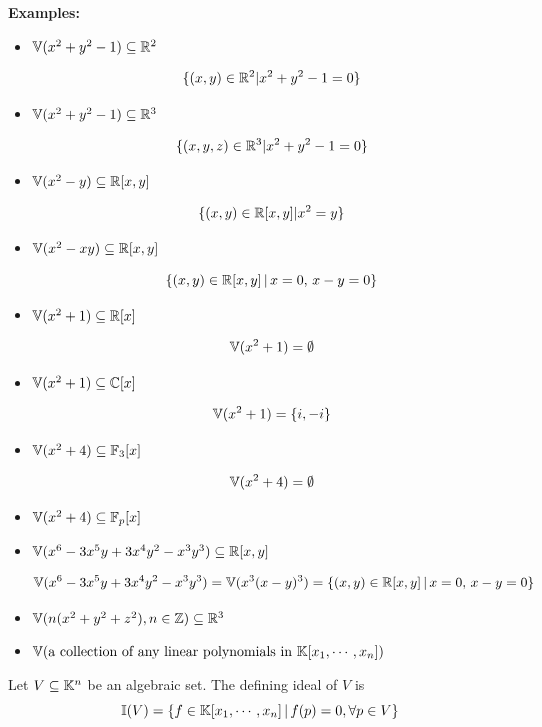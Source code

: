 \documentclass[12pt]{amsart}
\begin{document}
\textbf{Examples:} 
\begin{itemize}
    \item $\mathbb V(x^2 + y^2 -1) \subseteq \mathbb R^2$ 
    
    \[\{(x,y) \in \mathbb R^2 | x^2 + y^2 - 1 = 0\}\]


    \item $\mathbb V(x^2 + y^2 -1) \subseteq \mathbb R^3$ 
    
    \[\{(x,y, z) \in \mathbb R^3 | x^2 + y^2 - 1 = 0\}\]


    \item $\mathbb V(x^2 - y) \subseteq \mathbb R[x,y]$ 
    
    \[\{(x,y) \in \mathbb R[x,y] | x^2 = y\}\]


    \item $\mathbb V(x^2 - xy) \subseteq \mathbb R[x,y]$ 
    
    \[\{(x,y) \in \mathbb R[x,y] \, | \,x = 0, \,  x- y = 0\}\]


    \item $\mathbb V(x^2 +1) \subseteq \mathbb R[x]$ 
    
    \[\mathbb V(x^2 + 1) = \emptyset\]

    \item $\mathbb V(x^2 +1) \subseteq \mathbb C[x]$ 
    
    \[\mathbb V(x^2 + 1) = \{i, -i\}\]


    \item $\mathbb V(x^2 +4) \subseteq \mathbb F_3[x]$ 
    
    \[\mathbb V(x^2 + 4) = \emptyset\]


    \item $\mathbb V(x^2 +4) \subseteq \mathbb F_p[x]$ 
    
    \todo{}


    \item $\mathbb V(x^6 - 3x^5y + 3x^4y^2 -x^3y^3) \subseteq \mathbb R[x,y]$ 
    
    \[\mathbb V(x^6 - 3x^5y + 3x^4y^2 -x^3y^3) = \mathbb V(x^3(x-y)^3) = \{(x,y) \in \mathbb R[x,y] \, | \,x = 0, \,  x- y = 0\}\]

    \item $\mathbb V(n(x^2+y^2+z^2), n \in \mathbb Z) \subseteq \mathbb R^3$
    
    \todo{} 

    \item $\mathbb V(\text{a collection of any linear polynomials in } \mathbb K[x_1, \cdots, x_n])$
    
    \todo{}
\end{itemize}

\begin{definition}
    Let $V \subseteq \mathbb K^n$ be an algebraic set. The defining ideal of $V$ is 
    \[\mathbb I(V) = \{f \in \mathbb K[x_1, \cdots, x_n] \, | \, f(p) = 0, \forall p \in V \}\]
\end{definition}
\end{document}
